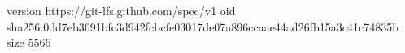 version https://git-lfs.github.com/spec/v1
oid sha256:0dd7eb3691bfc3d942fcbcfe03017de07a896ccaae44ad26fb15a3c41c74835b
size 5566
